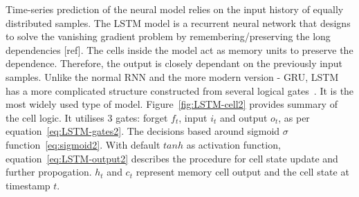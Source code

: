 Time-series prediction of the neural model relies on the input history of equally distributed samples.
The LSTM model is a recurrent neural network that designs to solve the vanishing gradient problem by remembering/preserving the long dependencies [ref].
The cells inside the model act as memory units to preserve the dependence.
Therefore, the output is closely dependant on the previously input samples.
Unlike the normal RNN and the more modern version - GRU, LSTM has a more complicated structure constructed from several logical gates~\cite{LSTM_Hochreiter1997}.
It is the most widely used type of model.
Figure~\ref{fig:LSTM-cell2} provides summary of the cell logic.
It utilises 3 gates: forget $f_t$, input $i_t$ and output $o_t$, as per equation~\ref{eq:LSTM-gates2}.
The decisions based around sigmoid $\sigma$ function~\ref{eq:sigmoid2}.
With default $tanh$ as activation function, equation~\ref{eq:LSTM-output2} describes the procedure for cell state update and further propogation.
$h_t$ and $c_t$ represent memory cell output and the cell state at timestamp $t$.

